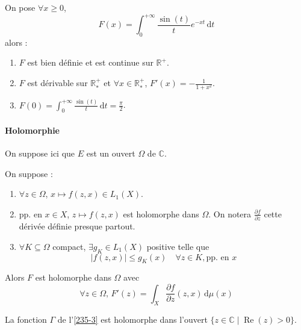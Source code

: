 
  \begin{application}
    On pose $\forall x \geq 0$,
    \[ F(x) = \int_0^{+\infty} \frac{\sin(t)}{t} e^{-xt} \, \mathrm{d}t \]
    alors :
    \begin{enumerate}[label={\bfseries(\roman*)}]
      \item $F$ est bien définie et est continue sur $\mathbb{R}^+$.
      \item $F$ est dérivable sur $\mathbb{R}^+_*$ et $\forall x \in \mathbb{R}^+_*$, $F'(x) = -\frac{1}{1+x^2}$.
      \item $F(0) = \int_0^{+\infty} \frac{\sin(t)}{t} \, \mathrm{d}t = \frac{\pi}{2}$.
    \end{enumerate}
  \end{application}

  \paragraph{Holomorphie}


  On suppose ici que $E$ est un ouvert $\Omega$ de $\mathbb{C}$.

  \begin{theorem}
    On suppose :
    \begin{enumerate}[label={\bfseries(\roman*)}]
      \item $\forall z \in \Omega$, $x \mapsto f(z,x) \in L_1(X)$.
      \item pp. en $x \in X$, $z \mapsto f(z,x)$ est holomorphe dans $\Omega$. On notera $\frac{\partial f}{\partial z}$ cette dérivée définie presque partout.
      \item $\forall K \subseteq \Omega$ compact, $\exists g_K \in L_1(X)$ positive telle que
      \[ \left| f(z,x) \right| \leq g_K(x) \quad \forall z \in K, \text{pp. en } x \]
    \end{enumerate}
    Alors $F$ est holomorphe dans $\Omega$ avec
    \[ \forall z \in \Omega, \, F'(z) = \int_X \frac{\partial f}{\partial z}(z, x) \, \mathrm{d}\mu(x) \]
  \end{theorem}


  \begin{example}
    La fonction $\Gamma$ de l'\cref{235-3} est holomorphe dans l'ouvert $\{ z \in \mathbb{C} \mid \operatorname{Re}(z) > 0 \}$.
  \end{example}

